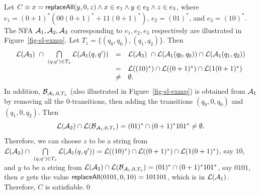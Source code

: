 \begin{example}\label{exmp-sl}
Let $C \equiv x= \mathsf{replaceAll}(y, 0, z) \wedge x \in e_1 \wedge y \in e_2 \wedge z \in e_3$, where $e_1=(0+1)^* (00(0+1)^* + 11(0+1)^*)$,  $e_2= (01)^*$,  and $e_3 = (10)^*$. The NFA $\mathcal{A}_{1}, \mathcal{A}_{2}, \mathcal{A}_{3}$ corresponding to $e_1, e_2, e_3$ respectively are illustrated in Figure~\ref{fig-sl-exmp}. Let $T_z = \{(q_0, q_0), (q_1, q_2)\}$.  Then 
$$
\begin{array}{l c l}
 \mathcal{L}(\mathcal{A}_3)\ \cap\ \bigcap \limits_{(q, q') \in T_z} \mathcal{L}(\mathcal{A}_1(q, q'))  & = & \mathcal{L}(\mathcal{A}_3)\ \cap \mathcal{L}(\mathcal{A}_1(q_0, q_0)) \cap \mathcal{L}(\mathcal{A}_1(q_1,q_2)) \\
& = & \mathcal{L}((10)^*) \cap \mathcal{L}((0+1)^*) \cap \mathcal{L}(1(0+1)^*) \\
& \neq & \emptyset.
\end{array}
$$
In addition, $\mathcal{B}_{\mathcal{A}_1, 0, T_z}$ (also illustrated in Figure~\ref{fig-sl-exmp}) is obtained from $\mathcal{A}_1$ by removing all the $0$-transitions, then adding the transitions $(q_0, 0, q_0)$ and $(q_1, 0, q_2)$. Then
$$
 \mathcal{L}(\mathcal{A}_2) \cap \mathcal{L}(\mathcal{B}_{\mathcal{A}_1,0,T_z})   =  (01)^* \cap (0+1)^* 10 1^* \neq \emptyset.
$$
Therefore, we can choose $z$ to be a string from $\mathcal{L}(\mathcal{A}_3) \cap \ \bigcap \limits_{(q, q') \in T_z} \mathcal{L}(\mathcal{A}_1(q, q'))=\mathcal{L}((10)^*) \cap \mathcal{L}((0+1)^*) \cap \mathcal{L}(1(0+1)^*)$, say $10$, and $y$ to be a string from $ \mathcal{L}(\mathcal{A}_2) \cap \mathcal{L}(\mathcal{B}_{\mathcal{A}_1,0,T_z})   =  (01)^* \cap (0+1)^* 10 1^*$, say $0101$,  then $x$ gets the value $\mathsf{replaceAll}(0101, 0, 10)=101101$, which is in $\mathcal{L}(\mathcal{A}_1)$. Therefore, $C$ is satisfiable.\qed
%
\begin{figure}[htbp]
\begin{center}

\end{center}
\end{figure}
\end{example}
